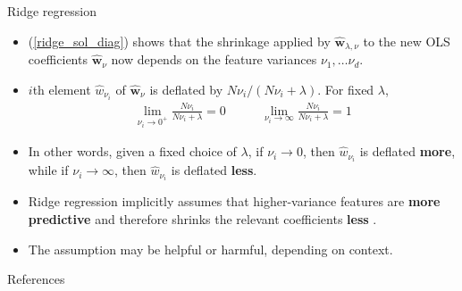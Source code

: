 \documentclass{beamer}
\numberwithin{equation}{section}
\newcommand{\aref}[1]{\alert{\ref{#1}}}
\begin{document}
\begin{frame}{Ridge regression}
    \begin{itemize}
        \item 
        (\aref{ridge_sol_diag}) shows that the shrinkage applied by
        $ \hat{\mathbf{w}}_{\lambda, \nu} $ to the new OLS coefficients
        $ \hat{\mathbf{w}}_\nu $ now depends on the feature variances
        $ \nu_1, \ldots \nu_d $.

        \item
        $ i $th element $ \hat{w}_{\nu_i} $ of $ \hat{\mathbf{w}}_\nu $ is
        deflated by $ N\nu_i / (N\nu_i + \lambda) $. For fixed $ \lambda $,
        \begin{equation*}
            \begin{array}{cc}
                \displaystyle\lim_{\nu_i \rightarrow 0^+}
                \frac{N\nu_i}{N\nu_i + \lambda} = 0 \quad & \quad
                \displaystyle\lim_{\nu_i \rightarrow \infty}
                \frac{N\nu_i}{N\nu_i + \lambda} = 1
            \end{array}
        \end{equation*}

        \item
        In other words, given a fixed choice of $ \lambda $, if
        $ \nu_i\rightarrow 0 $, then $ \hat{w}_{\nu_i} $ is deflated
        \textbf{more}, while if $ \nu_i \rightarrow \infty $, then
        $ \hat{w}_{\nu_i} $ is deflated \textbf{less}.

        \item
        \alert{
            Ridge regression implicitly assumes that higher-variance features
            are \textbf{more predictive} and therefore shrinks the relevant
            coefficients \textbf{less}
        }.

        \item
        The assumption may be helpful or harmful, depending on context.
    \end{itemize}
\end{frame}

\begin{frame}{References}
    
    
\end{frame}
\end{document}
